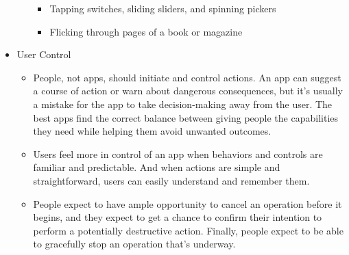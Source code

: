 \begin{itemize}
\begin{itemize}
\begin{itemize}
		\item Tapping switches, sliding sliders, and spinning pickers
		\item Flicking through pages of a book or magazine
		\end{itemize}
	\end{itemize}
\newpage
\item User Control
	\begin{itemize}
	\item People, not apps, should initiate and control actions. An app can suggest a course of action or warn about dangerous consequences, but it's usually a mistake for the app to take decision-making away from the user. The best apps find the correct balance between giving people the capabilities they need while helping them avoid unwanted outcomes.
	\item Users feel more in control of an app when behaviors and controls are familiar and predictable. And when actions are simple and straightforward, users can easily understand and remember them. 
	\item People expect to have ample opportunity to cancel an operation before it begins, and they expect to get a chance to confirm their intention to perform a potentially destructive action. Finally, people expect to be able to gracefully stop an operation that's underway. 
	\end{itemize}
\end{itemize}
